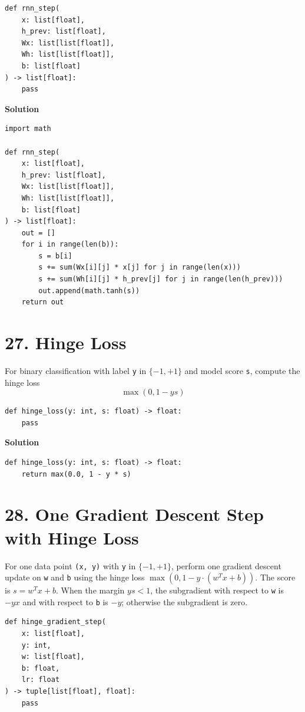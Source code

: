 \documentclass[11pt]{article}
\begin{document}
\begin{lstlisting}
def rnn_step(
    x: list[float],
    h_prev: list[float],
    Wx: list[list[float]],
    Wh: list[list[float]],
    b: list[float]
) -> list[float]:
    pass
\end{lstlisting}

\medskip
\noindent\textbf{Solution}
\begin{lstlisting}
import math

def rnn_step(
    x: list[float],
    h_prev: list[float],
    Wx: list[list[float]],
    Wh: list[list[float]],
    b: list[float]
) -> list[float]:
    out = []
    for i in range(len(b)):
        s = b[i]
        s += sum(Wx[i][j] * x[j] for j in range(len(x)))
        s += sum(Wh[i][j] * h_prev[j] for j in range(len(h_prev)))
        out.append(math.tanh(s))
    return out
\end{lstlisting}

\section*{27. Hinge Loss}
For binary classification with label \texttt{y} in \(\{-1, +1\}\) and model score \texttt{s}, compute the hinge loss
\[
\max(0, 1 - y s)
\]

\begin{lstlisting}
def hinge_loss(y: int, s: float) -> float:
    pass
\end{lstlisting}

\medskip
\noindent\textbf{Solution}
\begin{lstlisting}
def hinge_loss(y: int, s: float) -> float:
    return max(0.0, 1 - y * s)
\end{lstlisting}

\section*{28. One Gradient Descent Step with Hinge Loss}
For one data point \texttt{(x, y)} with \texttt{y} in \(\{-1, +1\}\), perform one gradient descent update on \texttt{w} and \texttt{b} using the hinge loss \(\max(0, 1 - y \cdot (w^T x + b))\). The score is \(s = w^T x + b\). When the margin \(y s < 1\), the subgradient with respect to \texttt{w} is \(-y x\) and with respect to \texttt{b} is \(-y\); otherwise the subgradient is zero.

\begin{lstlisting}
def hinge_gradient_step(
    x: list[float],
    y: int,
    w: list[float],
    b: float,
    lr: float
) -> tuple[list[float], float]:
    pass
\end{lstlisting}
\end{document}

